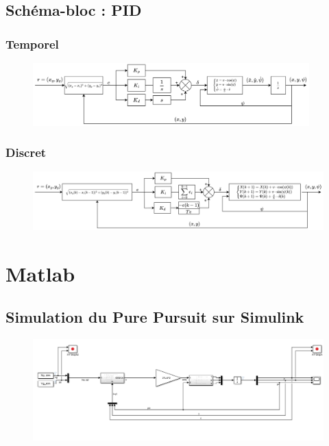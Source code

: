 \documentclass[a4paper,12pt]{extarticle}
\begin{document}
\subsection{Schéma-bloc : PID}
\subsubsection{Temporel}

\begin{figure}[h!]
    \centering
    \includegraphics[width=0.95\textwidth]{image/PID_temps.png}\\
\end{figure}

\pagebreak

\subsubsection{Discret}

\begin{figure}[h]
    \centering
    \includegraphics[width=1\textwidth]{image/PID_discret.png}\\
\end{figure}

\section{Matlab}
\subsection{Simulation du Pure Pursuit sur Simulink}

\begin{figure}[h]
    \centering
    \includegraphics[width=1\textwidth]{image/PP_matlab_temps.png}\\
\end{figure}
\end{document}
